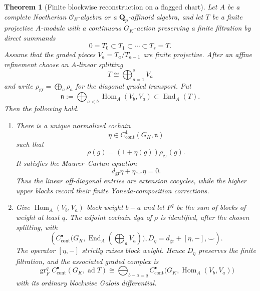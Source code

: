 \documentclass[11pt]{article}
\newtheorem{theorem}{Theorem}[section]
\theoremstyle{definition}
\newcommand{\Qp}{\mathbf Q_p}
\begin{document}
\begin{theorem}[Finite blockwise reconstruction on a flagged chart]\label{thm:flagged-gma-perturbation}
Let $A$ be a complete Noetherian $\mathcal O_E$-algebra or a $\Qp$-affinoid algebra, and let $T$ be a finite projective $A$-module with a continuous $G_K$-action preserving a finite filtration by direct summands
\[
0=T_0\subset T_1\subset\cdots\subset T_s=T.
\]
Assume that the graded pieces $V_a=T_a/T_{a-1}$ are finite projective.  After an affine refinement choose an $A$-linear splitting
\[
T\cong\bigoplus_{a=1}^s V_a
\]
and write $\rho_{\mathrm{gr}}=\bigoplus_a\rho_a$ for the diagonal graded transport.  Put
\[
\mathfrak n
:=\bigoplus_{a<b}\operatorname{Hom}_A(V_b,V_a)
\subset\operatorname{End}_A(T).
\]
Then the following hold.

\begin{enumerate}[label=\textnormal{(\roman*)}]
\item There is a unique normalized cochain
\[
\eta\in C^1_{\mathrm{cont}}(G_K,\mathfrak n)
\]
such that
\begin{equation}\label{eq:flagged-transport-mc-coordinate}
\rho(g)=(1+\eta(g))\rho_{\mathrm{gr}}(g).
\end{equation}
It satisfies the Maurer--Cartan equation
\begin{equation}\label{eq:flagged-extension-mc}
 d_{\mathrm{gr}}\eta+\eta\smile\eta=0.
\end{equation}
Thus the linear off-diagonal entries are extension cocycles, while the higher upper blocks record their finite Yoneda-composition corrections.

\item Give
$\operatorname{Hom}_A(V_b,V_a)$ block weight $b-a$ and let $F^q$ be the sum of blocks of weight at least $q$.  The adjoint cochain dga of $\rho$ is identified, after the chosen splitting, with
\begin{equation}\label{eq:flagged-adjoint-twist}
\left(
 C^\bullet_{\mathrm{cont}}
 \bigl(G_K,\operatorname{End}_A(\textstyle\bigoplus_aV_a)\bigr),
 D_\eta=d_{\mathrm{gr}}+[\eta,-],
 \smile
\right).
\end{equation}
The operator $[\eta,-]$ strictly raises block weight.  Hence $D_\eta$ preserves the finite filtration, and the associated graded complex is
\begin{equation}\label{eq:flagged-adjoint-associated-graded}
\operatorname{gr}^q_F C^\bullet_{\mathrm{cont}}(G_K,\operatorname{ad}T)
\cong
\bigoplus_{b-a=q}
 C^\bullet_{\mathrm{cont}}
 \bigl(G_K,\operatorname{Hom}_A(V_b,V_a)\bigr)
\end{equation}
with its ordinary blockwise Galois differential.


\end{enumerate}
\end{theorem}
\end{document}
